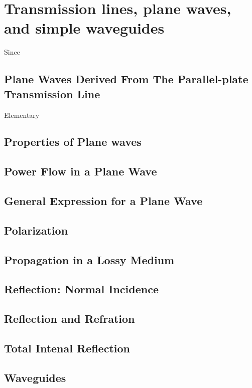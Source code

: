 \appendix

\chapter{Transmission lines, plane waves, and simple waveguides}
Since

\section{Plane Waves Derived From The Parallel-plate Transmission Line}
Elementary 

\section{Properties of Plane waves}

\section{Power Flow in a Plane Wave}

\section{General Expression for a Plane Wave}

\section{Polarization}

\section{Propagation in a Lossy Medium}

\section{Reflection: Normal Incidence}

\section{Reflection and Refration}

\section{Total Intenal Reflection}

\section{Waveguides}
\label{sec:wg}

